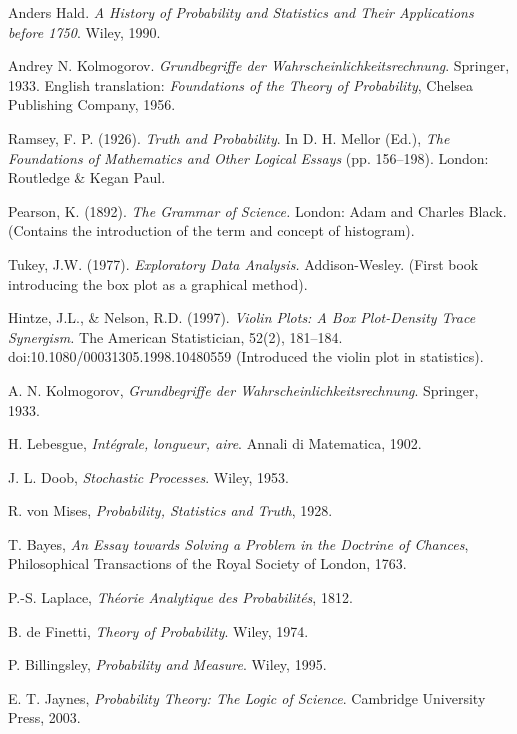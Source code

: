 \documentclass{book}
\begin{document}
\begin{thebibliography}{999}
Anders Hald.  
\textit{A History of Probability and Statistics and Their Applications before 1750}.  
Wiley, 1990.

Andrey N. Kolmogorov.  
\textit{Grundbegriffe der Wahrscheinlichkeitsrechnung}.  
Springer, 1933. English translation: \textit{Foundations of the Theory of Probability}, Chelsea Publishing Company, 1956.

Ramsey, F. P. (1926). 
\textit{Truth and Probability}. In D. H. Mellor (Ed.), \textit{The Foundations of Mathematics and Other Logical Essays} (pp. 156–198). London: Routledge \& Kegan Paul.

Pearson, K. (1892).
\textit{The Grammar of Science.}
London: Adam and Charles Black. (Contains the introduction of the term and concept of histogram).

Tukey, J.W. (1977). 
\textit{Exploratory Data Analysis.}
Addison-Wesley.  (First book introducing the box plot as a graphical method).

Hintze, J.L., \& Nelson, R.D. (1997).
\textit{Violin Plots: A Box Plot-Density Trace Synergism.}
The American Statistician, 52(2), 181–184. doi:10.1080/00031305.1998.10480559 (Introduced the violin plot in statistics).

A. N. Kolmogorov, \emph{Grundbegriffe der Wahrscheinlichkeitsrechnung}.
Springer, 1933.

H. Lebesgue, \emph{Intégrale, longueur, aire}.
Annali di Matematica, 1902.

J. L. Doob, \emph{Stochastic Processes}.
 Wiley, 1953.

R. von Mises, \emph{Probability, Statistics and Truth}, 1928.

T. Bayes, \emph{An Essay towards Solving a Problem in the Doctrine of Chances}, Philosophical Transactions of the Royal Society of London, 1763.

P.-S. Laplace, \emph{Théorie Analytique des Probabilités}, 1812.

B. de Finetti, \emph{Theory of Probability}.
Wiley, 1974.

P. Billingsley, \emph{Probability and Measure}.
Wiley, 1995.

E. T. Jaynes, \emph{Probability Theory: The Logic of Science}.
Cambridge University Press, 2003.


\end{thebibliography}
\end{document}
